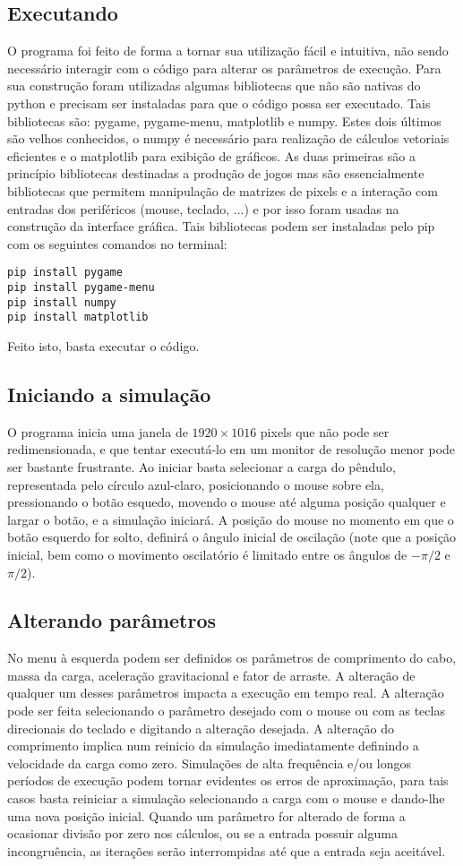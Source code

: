\documentclass[12pt]{article}
\begin{document}
    \subsection*{Executando}
    O programa foi feito de forma a tornar sua utilização fácil e intuitiva, não sendo necessário interagir com
    o código para alterar os parâmetros de execução. Para sua construção foram utilizadas algumas bibliotecas que
    não são nativas do python e precisam ser instaladas para que o código possa ser executado. Tais bibliotecas são:
    pygame, pygame-menu, matplotlib e numpy. Estes dois últimos são velhos conhecidos, o numpy é necessário para realização de cálculos vetoriais
    eficientes e o matplotlib para exibição de gráficos. As duas primeiras são a princípio bibliotecas destinadas a produção de jogos mas são essencialmente
    bibliotecas que permitem manipulação de matrizes de pixels e a interação com entradas dos periféricos (mouse, teclado, ...)
    e por isso foram usadas na construção da interface gráfica. Tais bibliotecas podem ser instaladas pelo pip com os seguintes comandos
    no terminal:
    \begin{lstlisting}
pip install pygame
pip install pygame-menu
pip install numpy
pip install matplotlib
    \end{lstlisting}
    \noindent Feito isto, basta executar o código.
    \subsection*{Iniciando a simulação}
    O programa inicia uma janela de $1920\times1016$ pixels que não pode ser redimensionada, e
    que tentar executá-lo em um monitor de resolução menor pode ser bastante frustrante. Ao iniciar basta selecionar a carga
    do pêndulo, representada pelo círculo azul-claro, posicionando o mouse sobre ela, pressionando o botão esquedo, movendo o mouse
    até alguma posição qualquer e largar o botão, e a simulação iniciará. A posição do mouse no momento em que o botão esquerdo for
    solto, definirá o ângulo inicial de oscilação (note que a posição inicial, bem como o movimento oscilatório é limitado
    entre os ângulos de $-\pi/2$ e $\pi/2$).
    \subsection*{Alterando parâmetros}
    No menu à esquerda podem ser definidos os parâmetros de comprimento do cabo, massa da carga, aceleração gravitacional e fator de arraste.
    A alteração de qualquer um desses parâmetros impacta a execução em tempo real. A alteração pode ser feita selecionando o parâmetro desejado
    com o mouse ou com as teclas direcionais do teclado e digitando a alteração desejada. A alteração do comprimento implica num reinicio da simulação
    imediatamente definindo a velocidade da carga como zero. Simulações de alta frequência e/ou longos períodos de execução
    podem tornar evidentes os erros de aproximação, para tais casos basta reiniciar a simulação selecionando a carga com o mouse
    e dando-lhe uma nova posição inicial. Quando um parâmetro for alterado de forma a ocasionar divisão por zero nos cálculos, ou se a entrada
    possuir alguma incongruência, as iterações serão interrompidas até que a entrada seja aceitável.
\end{document}

